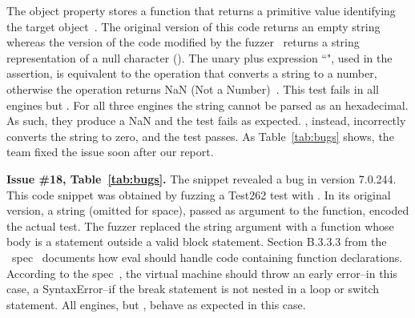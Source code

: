 \documentclass[smallextended]{svjour3}
\begin{document}
The object property  stores a function that returns a
primitive value identifying the target object~\cite{valueof}. The
original version of this code returns an empty string whereas the
version of the code modified by the \radamsa{} fuzzer~\cite{radamsa}
returns a string representation of a null character
(). The unary plus expression
``", used in the assertion, is equivalent to the operation
 that converts a string to a number,
otherwise the operation returns NaN (Not a
Number)~\cite{unary-plus}. This test fails in all engines but
\chakra{}. For all three engines the string cannot be parsed as an
hexadecimal. As such, they produce a NaN and the test fails as
expected. \chakra{}, instead, incorrectly converts the string to zero,
and the test passes. As Table~\ref{tab:bugs} shows, the \chakra{} team
fixed the issue soon after our report.

\vspace{1ex}\noindent\textbf{Issue \#18, Table~\ref{tab:bugs}.} The
snippet {\footnotesize{}}
revealed a bug in \textbf{\veight{}} version 7.0.244. This code snippet was
obtained by fuzzing a Test262 test with \quickfuzz. In its original
version, a string (omitted for space), passed as argument to the
 function, encoded the actual test. The fuzzer replaced
the string argument with a function whose body is a 
statement outside a valid block statement. Section B.3.3.3 from the
\es\ spec~\cite{spec-b333} documents how eval should handle code
containing function declarations.  According to the
spec~\cite{break-statement}, the virtual machine should throw an early
error--in this case, a SyntaxError--if the break statement is not
nested in a loop or switch statement. All engines, but \veight{},
behave as expected in this case.

\end{document}
